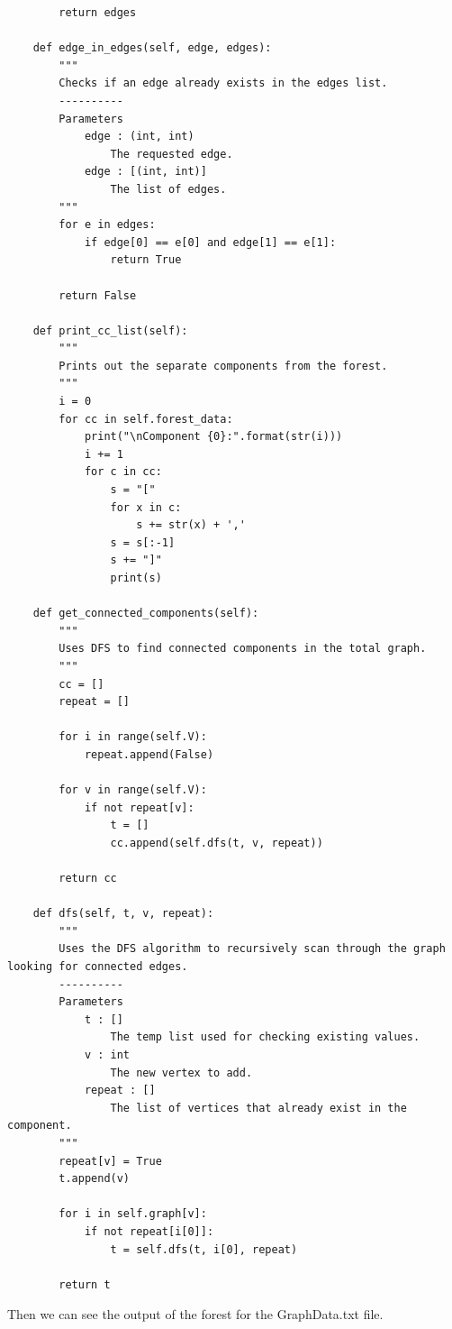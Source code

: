 \documentclass{article}
\begin{document}
\begin{enumerate}
\begin{lstlisting}
        return edges
    
    def edge_in_edges(self, edge, edges):
        """
        Checks if an edge already exists in the edges list.
        ----------
        Parameters
            edge : (int, int)
                The requested edge.
            edge : [(int, int)]
                The list of edges.
        """          
        for e in edges:
            if edge[0] == e[0] and edge[1] == e[1]:
                return True

        return False
            
    def print_cc_list(self):
        """
        Prints out the separate components from the forest.
        """          
        i = 0
        for cc in self.forest_data:
            print("\nComponent {0}:".format(str(i)))
            i += 1
            for c in cc:
                s = "["
                for x in c:
                    s += str(x) + ','
                s = s[:-1]
                s += "]"
                print(s)        
                
    def get_connected_components(self): 
        """
        Uses DFS to find connected components in the total graph.
        """           
        cc = [] 
        repeat = [] 
        
        for i in range(self.V): 
            repeat.append(False) 

        for v in range(self.V): 
            if not repeat[v]: 
                t = [] 
                cc.append(self.dfs(t, v, repeat)) 
        
        return cc 
    
    def dfs(self, t, v, repeat):
        """
        Uses the DFS algorithm to recursively scan through the graph looking for connected edges.
        ----------
        Parameters
            t : []
                The temp list used for checking existing values.
            v : int
                The new vertex to add.
            repeat : []
                The list of vertices that already exist in the component.
        """         
        repeat[v] = True
        t.append(v) 

        for i in self.graph[v]: 
            if not repeat[i[0]]: 
                t = self.dfs(t, i[0], repeat) 

        return t       
    \end{lstlisting}

    Then we can see the output of the forest for the GraphData.txt file.


\end{enumerate}
\end{document}
